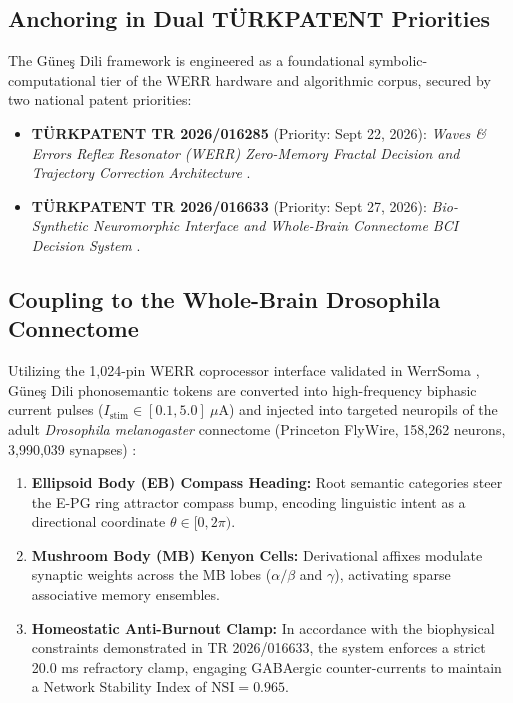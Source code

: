\documentclass[11pt,letterpaper]{article}
\begin{document}
\subsection{Anchoring in Dual T\"{U}RKPATENT Priorities}

The G\"{u}ne\c{s} Dili framework is engineered as a foundational symbolic-computational tier of the WERR hardware and algorithmic corpus, secured by two national patent priorities:
\begin{itemize}
    \item \textbf{T\"{U}RKPATENT TR 2026/016285} (Priority: Sept 22, 2026): \textit{Waves \& Errors Reflex Resonator (WERR) Zero-Memory Fractal Decision and Trajectory Correction Architecture} \cite{turkpatent_oed_2026}.
    \item \textbf{T\"{U}RKPATENT TR 2026/016633} (Priority: Sept 27, 2026): \textit{Bio-Synthetic Neuromorphic Interface and Whole-Brain Connectome BCI Decision System} \cite{turkpatent_werrsoma_2026}.
\end{itemize}

\subsection{Coupling to the Whole-Brain Drosophila Connectome}

Utilizing the 1,024-pin WERR coprocessor interface validated in WerrSoma \cite{dagli2026werrsoma}, G\"{u}ne\c{s} Dili phonosemantic tokens are converted into high-frequency biphasic current pulses ($I_{\text{stim}} \in [0.1, 5.0]\ \mu\text{A}$) and injected into targeted neuropils of the adult \textit{Drosophila melanogaster} connectome (Princeton FlyWire, 158,262 neurons, 3,990,039 synapses) \cite{dorkenwald2024flywire, schlegel2024whole}:
\begin{enumerate}
    \item \textbf{Ellipsoid Body (EB) Compass Heading:} Root semantic categories steer the E-PG ring attractor compass bump, encoding linguistic intent as a directional coordinate $\theta \in [0, 2\pi)$.
    \item \textbf{Mushroom Body (MB) Kenyon Cells:} Derivational affixes modulate synaptic weights across the MB lobes ($\alpha/\beta$ and $\gamma$), activating sparse associative memory ensembles.
    \item \textbf{Homeostatic Anti-Burnout Clamp:} In accordance with the biophysical constraints demonstrated in TR 2026/016633, the system enforces a strict 20.0 ms refractory clamp, engaging GABAergic counter-currents to maintain a Network Stability Index of $\text{NSI} = 0.965$.
\end{enumerate}
\end{document}
